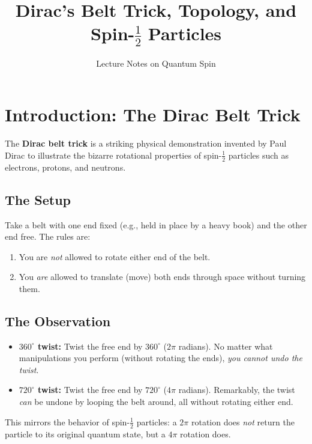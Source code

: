 \documentclass[11pt,a4paper]{article}
\title{\textbf{Dirac's Belt Trick, Topology, and Spin-$\frac{1}{2}$ Particles}}
\author{Lecture Notes on Quantum Spin}
\date{}
\theoremstyle{definition}
\theoremstyle{plain}
\theoremstyle{remark}
\begin{document}
\maketitle
\tableofcontents
\newpage

\section{Introduction: The Dirac Belt Trick}

The \textbf{Dirac belt trick} is a striking physical demonstration invented by Paul Dirac to illustrate the bizarre rotational properties of spin-$\frac{1}{2}$ particles such as electrons, protons, and neutrons.

\subsection{The Setup}

Take a belt with one end fixed (e.g., held in place by a heavy book) and the other end free. The rules are:
\begin{enumerate}[label=(\roman*)]
    \item You are \emph{not} allowed to rotate either end of the belt.
    \item You \emph{are} allowed to translate (move) both ends through space without turning them.
\end{enumerate}

\subsection{The Observation}

\begin{itemize}
    \item \textbf{$360^\circ$ twist:} Twist the free end by $360^\circ$ ($2\pi$ radians). No matter what manipulations you perform (without rotating the ends), \emph{you cannot undo the twist}.
    \item \textbf{$720^\circ$ twist:} Twist the free end by $720^\circ$ ($4\pi$ radians). Remarkably, the twist \emph{can} be undone by looping the belt around, all without rotating either end.
\end{itemize}

This mirrors the behavior of spin-$\frac{1}{2}$ particles: a $2\pi$ rotation does \emph{not} return the particle to its original quantum state, but a $4\pi$ rotation does.
\end{document}
